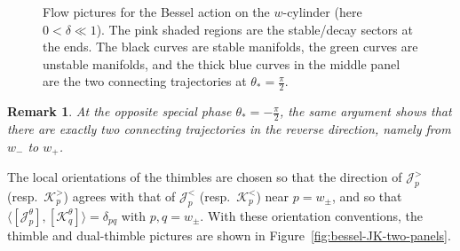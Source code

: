 \documentclass[11pt]{amsart}
\theoremstyle{plain}
\newtheorem{rmk}[thm]{Remark}
\newcommand{\J}{\mathcal J}
\newcommand{\Kk}{\mathcal K}
\begin{document}
\begin{figure}[H]
\begin{minipage}[c]{0.14\textwidth}
\centering
{}
\end{minipage}


\caption{
Flow pictures for the Bessel action on the \(w\)-cylinder (here \(0<\delta\ll 1\)).
The pink shaded regions are the stable/decay sectors at the ends.
The black curves are stable manifolds, the green curves are unstable manifolds, and the thick blue curves in the middle panel are the two connecting trajectories at \(\theta_*=\frac{\pi}{2}\).
}
\label{fig:bessel-three-phases}
\end{figure}

\begin{rmk}
At the opposite special phase \(\theta_*=-\frac{\pi}{2}\), the same argument shows that there are exactly two connecting trajectories in the reverse direction, namely from \(w_-\) to \(w_+\).
\end{rmk}


The local orientations of the thimbles are chosen so that the direction of \(\J_p^{>}\) (resp.\ \(\Kk_p^{>}\)) agrees with that of \(\J_p^{<}\) (resp.\ \(\Kk_p^{<}\)) near \(p=w_{\pm}\), and so that
$
\langle [\J_p^\theta],[\Kk_q^\theta]\rangle=\delta_{pq}
$ with $p,q=w_{\pm}$. With these orientation conventions, the thimble and dual-thimble pictures are shown in Figure~\ref{fig:bessel-JK-two-panels}.
\end{document}

